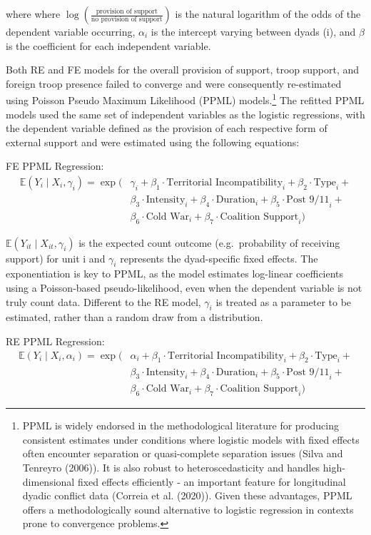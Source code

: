 \documentclass[
]{article}
\begin{document}
where where
\(\log \left( \frac{\text{provision of support}}{\text{no provision of support}} \right)\)
is the natural logarithm of the odds of the dependent variable
occurring, \(\alpha_i\) is the intercept varying between dyads (i), and
\(\beta\) is the coefficient for each independent variable.

Both RE and FE models for the overall provision of support, troop
support, and foreign troop presence failed to converge and were
consequently re-estimated using Poisson Pseudo Maximum Likelihood (PPML)
models.\footnote{PPML is widely endorsed in the methodological
  literature for producing consistent estimates under conditions where
  logistic models with fixed effects often encounter separation or
  quasi-complete separation issues (Silva and Tenreyro (2006)). It is
  also robust to heteroscedasticity and handles high-dimensional fixed
  effects efficiently - an important feature for longitudinal dyadic
  conflict data (Correia et al. (2020)). Given these advantages, PPML
  offers a methodologically sound alternative to logistic regression in
  contexts prone to convergence problems.} The refitted PPML models used
the same set of independent variables as the logistic regressions, with
the dependent variable defined as the provision of each respective form
of external support and were estimated using the following equations:

FE PPML Regression: \[
\begin{aligned}
\mathbb{E}(Y_{i} \mid X_{i}, \gamma_i) = \exp\bigg(&
\gamma_i + 
\beta_1 \cdot \text{Territorial Incompatibility}_{i} + 
\beta_2 \cdot \text{Type}_{i} + \\
&\beta_3 \cdot \text{Intensity}_{i} + 
\beta_4 \cdot \text{Duration}_{i} + 
\beta_5 \cdot \text{Post 9/11}_{i} + \\
&\beta_6 \cdot \text{Cold War}_{i} + 
\beta_7 \cdot \text{Coalition Support}_{i}
\bigg)
\end{aligned}
\]

\(\mathbb{E}(Y_{it} \mid X_{it}, \gamma_i)\) is the expected count
outcome (e.g.~probability of receiving support) for unit i and
\(\gamma_i\) represents the dyad-specific fixed effects. The
exponentiation is key to PPML, as the model estimates log-linear
coefficients using a Poisson-based pseudo-likelihood, even when the
dependent variable is not truly count data. Different to the RE model,
\(\gamma_i\) is treated as a parameter to be estimated, rather than a
random draw from a distribution.

RE PPML Regression: \[
\begin{aligned}
\mathbb{E}(Y_{i} \mid X_{i}, \alpha_i) = \exp\bigg(&
\alpha_i + 
\beta_1 \cdot \text{Territorial Incompatibility}_{i} + 
\beta_2 \cdot \text{Type}_{i} + \\
&\beta_3 \cdot \text{Intensity}_{i} + 
\beta_4 \cdot \text{Duration}_{i} + 
\beta_5 \cdot \text{Post 9/11}_{i} + \\
&\beta_6 \cdot \text{Cold War}_{i} + 
\beta_7 \cdot \text{Coalition Support}_{i}
\bigg)
\end{aligned}
\]
\end{document}
